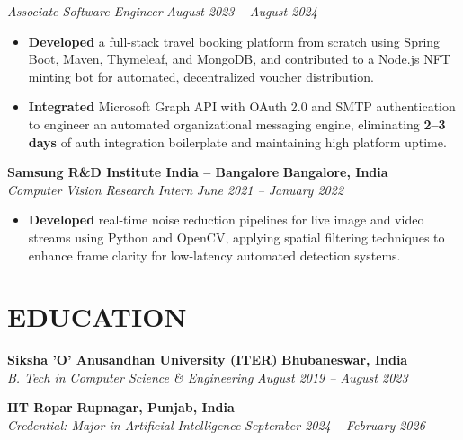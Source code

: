 \documentclass[10pt,a4paper]{article}
\begin{document}
\noindent \textit{Associate Software Engineer} \hfill \textit{August 2023 -- August 2024}

\begin{itemize}

    \item \textbf{Developed} a full-stack travel booking platform from scratch using Spring Boot, Maven, Thymeleaf, and MongoDB, and contributed to a Node.js NFT minting bot for automated, decentralized voucher distribution.

    \item \textbf{Integrated} Microsoft Graph API with OAuth 2.0 and SMTP authentication to engineer an automated organizational messaging engine, eliminating \textbf{2--3 days} of auth integration boilerplate and maintaining high platform uptime.

\end{itemize}

\vspace{2pt}

\noindent \textbf{Samsung R\&D Institute India -- Bangalore} \hfill \textbf{Bangalore, India} \\
\textit{Computer Vision Research Intern} \hfill \textit{June 2021 -- January 2022}

\begin{itemize}

    \item \textbf{Developed} real-time noise reduction pipelines for live image and video streams using Python and OpenCV, applying spatial filtering techniques to enhance frame clarity for low-latency automated detection systems.

\end{itemize}


\section*{EDUCATION}

\noindent \textbf{Siksha 'O' Anusandhan University (ITER)} \hfill \textbf{Bhubaneswar, India} \\
\textit{B. Tech in Computer Science \& Engineering} \hfill \textit{August 2019 -- August 2023}

\vspace{1pt}

\noindent \textbf{IIT Ropar} \hfill \textbf{Rupnagar, Punjab, India} \\
\textit{Credential: Major in Artificial Intelligence} \hfill \textit{September 2024 -- February 2026}
\end{document}
